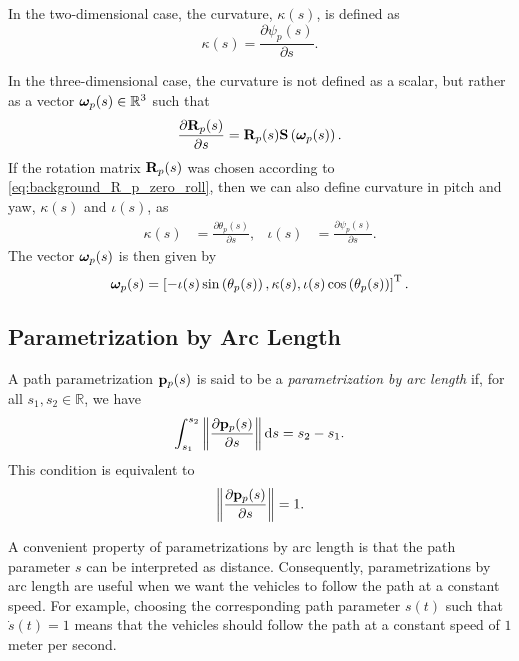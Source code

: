 In the two-dimensional case, the curvature, $\kappa(s)$, is defined as
\begin{equation}
    \kappa(s) = \frac{\partial \psi_{p}(s)}{\partial s}.
\end{equation}

In the three-dimensional case, the curvature is not defined as a scalar, but rather as a vector $\bm{\omega}_p(s) \in \mathbb{R}^3$ such that
\begin{equation}
    \frac{\partial \mathbf{R}_p(s)}{\partial s} = \mathbf{R}_p(s) \mathbf{S}\left(\bm{\omega}_p(s)\right).
\end{equation}
If the rotation matrix $\mathbf{R}_p(s)$ was chosen according to \eqref{eq:background_R_p_zero_roll}, then we can also define curvature in pitch and yaw, $\kappa(s)$ and $\iota(s)$, as
\begin{align}
    \kappa(s) &= \frac{\partial \theta_{p}(s)}{\partial s}, &
    \iota(s) &= \frac{\partial \psi_{p}(s)}{\partial s}.
\end{align}
The vector $\bm{\omega}_p(s)$ is then given by
\begin{equation}
    \bm{\omega}_p(s) = \left[-\iota(s)\sin\left(\theta_{p}(s)\right), \kappa(s), \iota(s)\cos\left(\theta_{p}(s)\right)\right]^{\mathrm{T}}.
\end{equation}

\subsection{Parametrization by Arc Length}
A path parametrization $\mathbf{p}_p(s)$ is said to be a \emph{parametrization by arc length} if, for all $s_1, s_2 \in \mathbb{R}$, we have
\begin{equation}
    \int_{s_1}^{s_2} \left\|\frac{\partial \mathbf{p}_p(s)}{\partial s}\right\| {\rm d}s = s_2 - s_1.
\end{equation}
This condition is equivalent to
\begin{equation}
    \left\|\frac{\partial \mathbf{p}_p(s)}{\partial s}\right\| = 1.
\end{equation}

A convenient property of parametrizations by arc length is that the path parameter $s$ can be interpreted as distance.
Consequently, parametrizations by arc length are useful when we want the vehicles to follow the path at a constant speed.
For example, choosing the corresponding path parameter $s(t)$ such that $\dot{s}(t) = 1$ means that the vehicles should follow the path at a constant speed of $1$ meter per second.

